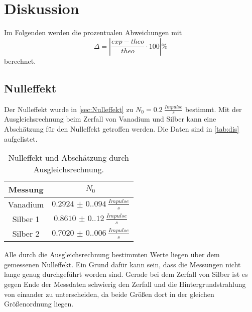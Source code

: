 \section{Diskussion}
\label{sec:Diskussion}
Im Folgenden werden die prozentualen Abweichungen mit 
\begin{equation}\label{eq:1}
    \Delta = |\frac{exp - theo}{theo} \cdot 100|\%
\end{equation}
berechnet.
\subsection{Nulleffekt}
Der Nulleffekt wurde in \autoref{sec:Nulleffekt} zu $N_0 = \SI{0.2}{\frac{Impulse}{s}}$ bestimmt. 
Mit der Ausgleichsrechnung beim Zerfall von Vanadium und Silber kann eine Abschätzung für den Nulleffekt getroffen werden. Die Daten sind in \autoref{tab:dis} 
aufgelistet.

\begin{table}[H]
    \centering
    \caption{Nulleffekt und Abschätzung durch Ausgleichsrechnung.}
    \begin{tabular}{c c}
        \toprule
        {Messung} & {$N_0$}\\
        \midrule
        Vanadium & $\SI{0.2924(0.094)}{\frac{Impulse}{s}}$\\
        Silber 1 & $\SI{0.8610(0.120)}{\frac{Impulse}{s}}$\\
        Silber 2 & $\SI{0.7020(0.006)}{\frac{Impulse}{s}}$\\
        \bottomrule
    \end{tabular}
    \label{tab:dis}
\end{table}

Alle durch die Ausgleichsrechnung bestimmten Werte liegen über dem gemessenen Nulleffekt.
Ein Grund dafür kann sein, dass die Messungen nicht lange genug durchgeführt worden sind. Gerade bei dem Zerfall von Silber ist es gegen Ende 
der Messdaten schwierig den Zerfall und die Hintergrundstrahlung von einander zu unterscheiden, da beide Größen dort 
in der gleichen Größenordnung liegen.


